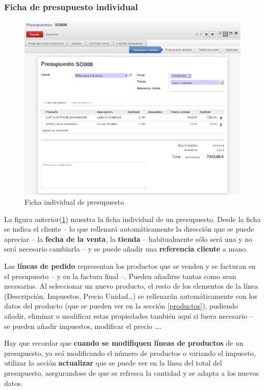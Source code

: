 \subsubsection{Ficha de presupuesto individual}
\begin{figure}[H]
\includegraphics[width=\textwidth]{ventas/img/ven_preindividual.png}
\caption{Ficha individual de presupuesto}
\label{ven:preindividual}
\end{figure}

La figura anterior(\ref{ven:preindividual}) muestra la ficha individual de un presupuesto. Desde la ficha se indica el cliente -- lo que rellenará automáticamente la dirección que se puede apreciar -- la \textbf{fecha de la venta}, la \textbf{tienda} -- habitualmente sólo 
será una y no será necesario cambiarla -- y se puede añadir una \textbf{referencia cliente} a mano.

Las \textbf{líneas de pedido} representan los productos que se venden y se facturan en el presupuesto -- y en la factura final --. Pueden añadirse tantas como sean necesarias. Al seleccionar un nuevo producto, el resto de los elementos de la línea (Descripción, Impuestos, Precio Unidad\ldots) se rellenarán automáticamente con los datos del producto (que se pueden ver en la sección \ref{productos}), pudiendo añadir, eliminar o modificar estas propiedades también aquí si fuera necesario -- se pueden añadir impuestos, modificar el precio \ldots.

Hay que recordar que \textbf{cuando se modifiquen líneas de productos} de un presupuesto, ya seá modificando el número de productos o
variando el impuesto, utilizar la acción \textbf{actualizar} que se puede ver en la línea del total del presupuesto, asegurandose de que se refresca la cantidad y se adapta a los nuevos datos.

